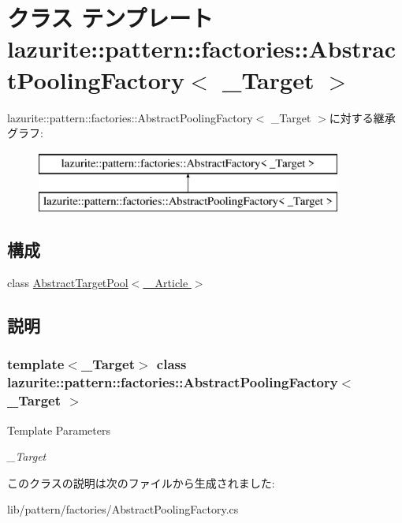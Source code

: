 \hypertarget{classlazurite_1_1pattern_1_1factories_1_1_abstract_pooling_factory_3_01___target_01_4}{
\section{クラス テンプレート lazurite::pattern::factories::AbstractPoolingFactory$<$ \_\-Target $>$}
\label{classlazurite_1_1pattern_1_1factories_1_1_abstract_pooling_factory_3_01___target_01_4}
}
lazurite::pattern::factories::AbstractPoolingFactory$<$ \_\-Target $>$に対する継承グラフ:\begin{figure}[H]
\begin{center}
\leavevmode
\includegraphics[height=2cm]{classlazurite_1_1pattern_1_1factories_1_1_abstract_pooling_factory_3_01___target_01_4}
\end{center}
\end{figure}
\subsection*{構成}
\begin{DoxyCompactItemize}
\item 
class \hyperlink{classlazurite_1_1pattern_1_1factories_1_1_abstract_pooling_factory_3_01___target_01_4_1_1_abstra513b29652c04fa77de240c337e958a8d}{AbstractTargetPool$<$ \_\-Article $>$}
\end{DoxyCompactItemize}


\subsection{説明}
\subsubsection*{template$<$\_\-Target$>$ class lazurite::pattern::factories::AbstractPoolingFactory$<$ \_\-Target $>$}


\begin{DoxyTemplParams}{Template Parameters}
\item[{\em \_\-Target}]\end{DoxyTemplParams}


このクラスの説明は次のファイルから生成されました:\begin{DoxyCompactItemize}
\item 
lib/pattern/factories/AbstractPoolingFactory.cs\end{DoxyCompactItemize}
